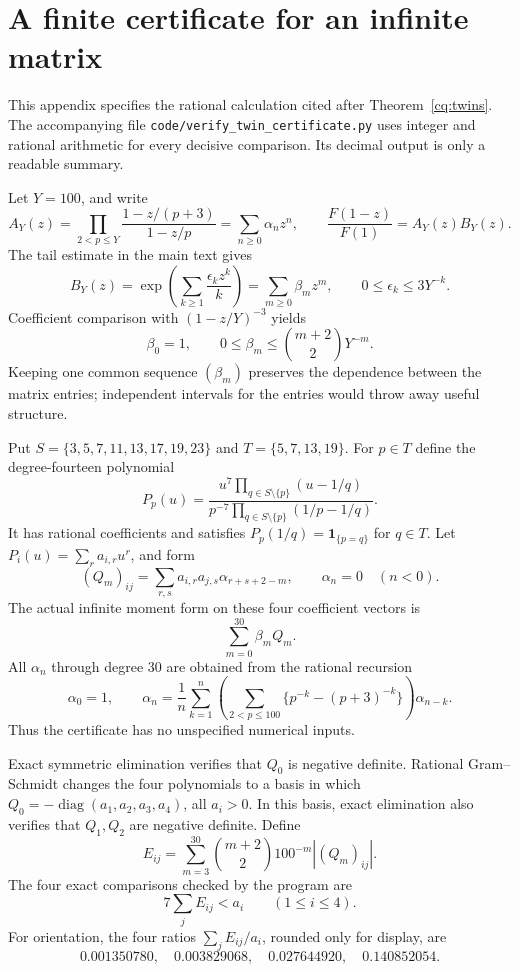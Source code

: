 \section{A finite certificate for an infinite matrix}\label{cq:certificate}

This appendix specifies the rational calculation cited after
Theorem~\ref{cq:twins}. The accompanying file
\texttt{code/verify\_twin\_certificate.py} uses integer and rational
arithmetic for every decisive comparison. Its decimal output is only
a readable summary.

Let \(Y=100\), and write
\[
 A_Y(z)=\prod_{2<p\leq Y}\frac{1-z/(p+3)}{1-z/p}
       =\sum_{n\geq0}\alpha_nz^n,\qquad
 \frac{F(1-z)}{F(1)}=A_Y(z)B_Y(z).
\]
The tail estimate in the main text gives
\[
 B_Y(z)=\exp\left(\sum_{k\geq1}\frac{\epsilon_kz^k}{k}\right)
       =\sum_{m\geq0}\beta_mz^m,\qquad
 0\leq\epsilon_k\leq3Y^{-k}.
\]
Coefficient comparison with \((1-z/Y)^{-3}\) yields
\begin{equation}\label{cq:betabound}
      \beta_0=1,\qquad 0\leq\beta_m\leq\binom{m+2}{2}Y^{-m}.
\end{equation}
Keeping one common sequence \((\beta_m)\) preserves the dependence between
the matrix entries; independent intervals for the entries would throw away
useful structure.

Put \(S=\{3,5,7,11,13,17,19,23\}\) and \(T=\{5,7,13,19\}\). For \(p\in T\)
define the degree-fourteen polynomial
\[
 P_p(u)=
 \frac{u^7\prod_{q\in S\setminus\{p\}}(u-1/q)}
      {p^{-7}\prod_{q\in S\setminus\{p\}}(1/p-1/q)}.
\]
It has rational coefficients and satisfies
\(P_p(1/q)=\mathbf1_{\{p=q\}}\) for \(q\in T\).
Let \(P_i(u)=\sum_r a_{i,r}u^r\), and form
\[
 (Q_m)_{ij}=\sum_{r,s}a_{i,r}a_{j,s}\alpha_{r+s+2-m},
 \qquad \alpha_n=0\quad(n<0).
\]
The actual infinite moment form on these four coefficient vectors is
\[
                         \sum_{m=0}^{30}\beta_m Q_m.
\]
All \(\alpha_n\) through degree \(30\) are obtained from the rational
recursion
\[
 \alpha_0=1,\qquad
 \alpha_n=\frac1n\sum_{k=1}^n
 \left(\sum_{2<p\leq100}\{p^{-k}-(p+3)^{-k}\}\right)\alpha_{n-k}.
\]
Thus the certificate has no unspecified numerical inputs.

Exact symmetric elimination verifies that \(Q_0\) is negative definite.
Rational Gram--Schmidt changes the four polynomials to a basis in which
\(Q_0=-\operatorname{diag}(a_1,a_2,a_3,a_4)\), all \(a_i>0\).
In this basis, exact elimination also verifies that \(Q_1,Q_2\) are
negative definite. Define
\[
 E_{ij}=\sum_{m=3}^{30}\binom{m+2}{2}100^{-m}|(Q_m)_{ij}|.
\]
The four exact comparisons checked by the program are
\begin{equation}\label{cq:rowcertificate}
                    7\sum_jE_{ij}<a_i\qquad(1\leq i\leq4).
\end{equation}
For orientation, the four ratios \(\sum_jE_{ij}/a_i\), rounded only for
display, are
\[
        0.001350780,\quad0.003829068,\quad
        0.027644920,\quad0.140852054 .
\]

